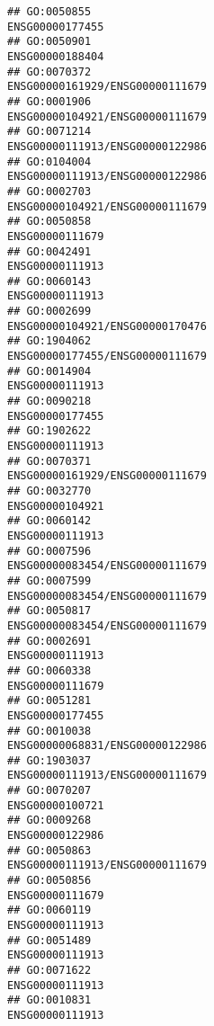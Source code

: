 \documentclass[
]{article}
\begin{document}
\begin{verbatim}
## GO:0050855                                                 ENSG00000177455
## GO:0050901                                                 ENSG00000188404
## GO:0070372                                 ENSG00000161929/ENSG00000111679
## GO:0001906                                 ENSG00000104921/ENSG00000111679
## GO:0071214                                 ENSG00000111913/ENSG00000122986
## GO:0104004                                 ENSG00000111913/ENSG00000122986
## GO:0002703                                 ENSG00000104921/ENSG00000111679
## GO:0050858                                                 ENSG00000111679
## GO:0042491                                                 ENSG00000111913
## GO:0060143                                                 ENSG00000111913
## GO:0002699                                 ENSG00000104921/ENSG00000170476
## GO:1904062                                 ENSG00000177455/ENSG00000111679
## GO:0014904                                                 ENSG00000111913
## GO:0090218                                                 ENSG00000177455
## GO:1902622                                                 ENSG00000111913
## GO:0070371                                 ENSG00000161929/ENSG00000111679
## GO:0032770                                                 ENSG00000104921
## GO:0060142                                                 ENSG00000111913
## GO:0007596                                 ENSG00000083454/ENSG00000111679
## GO:0007599                                 ENSG00000083454/ENSG00000111679
## GO:0050817                                 ENSG00000083454/ENSG00000111679
## GO:0002691                                                 ENSG00000111913
## GO:0060338                                                 ENSG00000111679
## GO:0051281                                                 ENSG00000177455
## GO:0010038                                 ENSG00000068831/ENSG00000122986
## GO:1903037                                 ENSG00000111913/ENSG00000111679
## GO:0070207                                                 ENSG00000100721
## GO:0009268                                                 ENSG00000122986
## GO:0050863                                 ENSG00000111913/ENSG00000111679
## GO:0050856                                                 ENSG00000111679
## GO:0060119                                                 ENSG00000111913
## GO:0051489                                                 ENSG00000111913
## GO:0071622                                                 ENSG00000111913
## GO:0010831                                                 ENSG00000111913

\end{verbatim}
\end{document}
